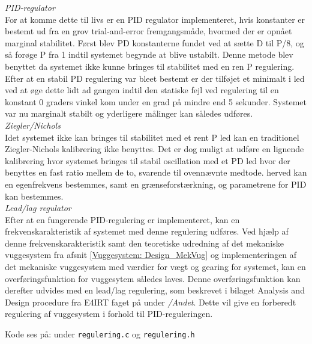 \textit{PID-regulator}\\
For at komme dette til livs er en PID regulator implementeret, hvis konstanter er bestemt ud fra en grov trial-and-error fremgangsmåde, hvormed der er opnået marginal stabilitet. Først blev PD konstanterne fundet ved at sætte D til P/8, og så forøge P fra 1 indtil systemet begynde at blive ustabilt. Denne metode blev benyttet da systemet ikke kunne bringes til stabilitet med en ren P regulering. Efter at en stabil PD regulering var bleet bestemt er der tilføjet et minimalt i led ved at øge dette lidt ad gangen indtil den statiske fejl ved regulering til en konstant 0 graders vinkel kom under en grad på mindre end 5 sekunder. Systemet var nu marginalt stabilt og yderligere målinger kan således udføres. \\

\textit{Ziegler/Nichols}\\
Idet systemet ikke kan bringes til stabilitet med et rent P led kan en traditionel Ziegler-Nichols kalibrering ikke benyttes. Det er dog muligt at udføre en lignende kalibrering hvor systemet bringes til stabil oscillation med et PD led hvor der benyttes en fast ratio mellem de to, svarende til ovennævnte medtode. herved kan en egenfrekvens bestemmes, samt en grænseforstærkning, og parametrene for PID kan bestemmes.\\

\textit{Lead/lag regulator}\\
Efter at en fungerende PID-regulering er implementeret, kan en frekvenskarakteristik af systemet med denne regulering udføres. Ved hjælp af denne frekvenskarakteristik samt den teoretiske udredning af det mekaniske vuggesystem fra afsnit \vref{Vuggesystem: Design_MekVug} og implementeringen af det mekaniske vuggesystem med værdier for vægt og gearing for systemet, kan en overføringsfunktion for vuggesytem således laves. Denne overføringsfunktion kan derefter udvides med en lead/lag regulering, som beskrevet i bilaget Analysis and Design procedure \citep{IRT} fra E4IRT faget på \citep{cd} under \textit{/Andet}. Dette vil give en forberedt regulering af vuggesystem i forhold til PID-reguleringen.

Kode ses på: \citep{cd} under \verb+regulering.c+ og \verb+regulering.h+\\

\newpage